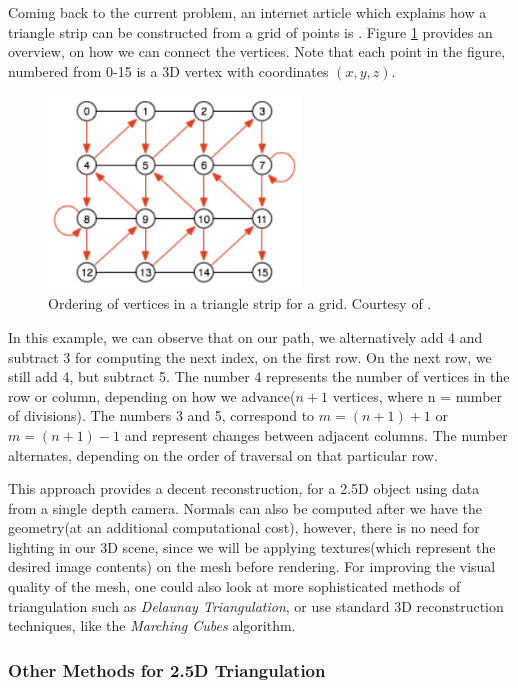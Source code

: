 \documentclass[]{article}
\begin{document}
Coming back to the current problem, an internet article which explains how a triangle strip can be constructed from a grid of points is \cite{triangleStrip}. Figure \ref{fig:TriangleStrip} provides an overview, on how we can connect the vertices. Note that each point in the figure, numbered from 0-15 is a 3D vertex with coordinates $(x,y,z)$. 

\begin{figure}[hbtp]
    \centering
    \includegraphics[width=0.6\textwidth]{figures/TriangleStripOrdering.PNG}
    \caption{Ordering of vertices in a triangle strip for a grid. Courtesy of \cite{triangleStrip}.}
    \label{fig:TriangleStrip}
\end{figure}

In this example, we can observe that on our path, we alternatively add 4 and subtract 3 for computing the next index, on the first row. On the next row, we still add 4, but subtract 5. The number 4 represents the number of vertices in the row or column, depending on how we advance($n + 1$ vertices, where n = number of divisions).
The numbers 3 and 5, correspond to $m = (n+1) + 1$ or $m = (n+1) - 1$ and represent changes between adjacent columns. The number alternates, depending on the order of traversal on that particular row.

This approach provides a decent reconstruction, for a 2.5D object using data from a single depth camera. Normals can also be computed after we have the geometry(at an additional computational cost), however, there is no need for lighting in our 3D scene, since we will be applying textures(which represent the desired image contents) on the mesh before rendering. For improving the visual quality of the mesh, one could also look at more sophisticated methods of triangulation such as \textit{Delaunay Triangulation}, or use standard 3D reconstruction techniques, like the \textit{Marching Cubes} algorithm.

\subsubsection{Other Methods for 2.5D Triangulation}
\end{document}
